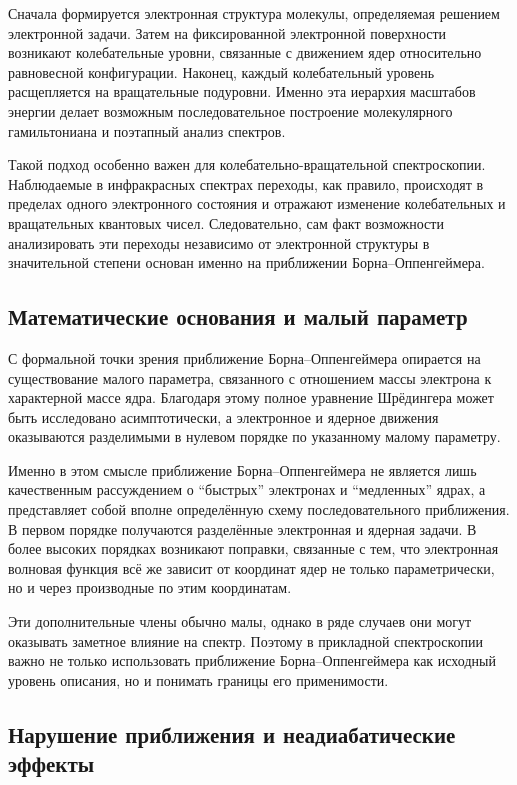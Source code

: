 Сначала формируется электронная структура молекулы, определяемая
решением электронной задачи. Затем на фиксированной электронной
поверхности возникают колебательные уровни, связанные с движением
ядер относительно равновесной конфигурации. Наконец, каждый
колебательный уровень расщепляется на вращательные подуровни.
Именно эта иерархия масштабов энергии делает возможным
последовательное построение молекулярного гамильтониана
и поэтапный анализ спектров.

Такой подход особенно важен для колебательно-вращательной
спектроскопии. Наблюдаемые в инфракрасных спектрах переходы,
как правило, происходят в пределах одного электронного состояния
и отражают изменение колебательных и вращательных квантовых чисел.
Следовательно, сам факт возможности анализировать эти переходы
независимо от электронной структуры в значительной степени основан
именно на приближении Борна--Оппенгеймера.

\subsection{Математические основания и малый параметр}

С формальной точки зрения приближение Борна--Оппенгеймера опирается
на существование малого параметра, связанного с отношением массы
электрона к характерной массе ядра. Благодаря этому полное уравнение
Шрёдингера может быть исследовано асимптотически, а электронное
и ядерное движения оказываются разделимыми в нулевом порядке
по указанному малому параметру.

Именно в этом смысле приближение Борна--Оппенгеймера не является
лишь качественным рассуждением о ``быстрых'' электронах и
``медленных'' ядрах, а представляет собой вполне определённую
схему последовательного приближения. В первом порядке получаются
разделённые электронная и ядерная задачи. В более высоких порядках
возникают поправки, связанные с тем, что электронная волновая функция
всё же зависит от координат ядер не только параметрически, но и
через производные по этим координатам.

Эти дополнительные члены обычно малы, однако в ряде случаев
они могут оказывать заметное влияние на спектр. Поэтому
в прикладной спектроскопии важно не только использовать
приближение Борна--Оппенгеймера как исходный уровень описания,
но и понимать границы его применимости.

\subsection{Нарушение приближения и неадиабатические эффекты}

